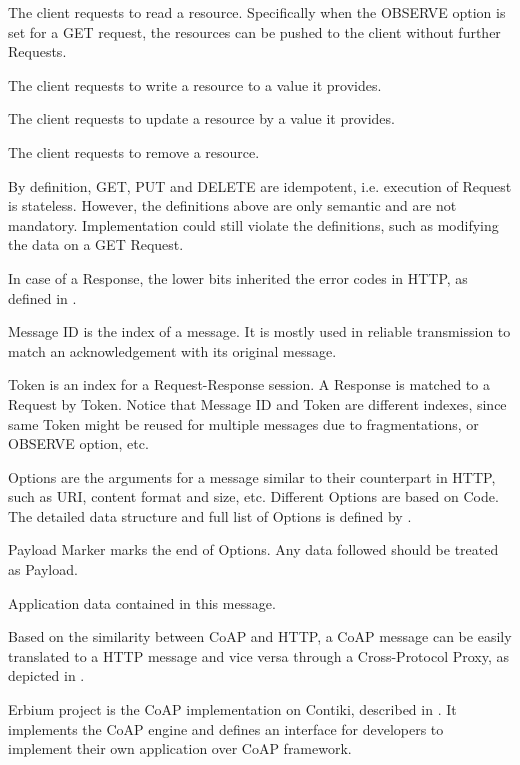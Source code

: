 \begin{description}[style=nextline]
\begin{description}[style=nextline]
		\item[\textbf{GET}] 
		The client requests to read a resource. Specifically when the OBSERVE option is set for a GET request, the resources can be pushed to the client  without further Requests\cite{rfc7641}.
		\item[\textbf{PUT}] 
		The client requests to write a resource to a value it provides.
		\item[\textbf{POST}] 
		The client requests to update a resource by a value it provides.
		\item[\textbf{DELETE}]
		 The client requests to remove a resource.
	\end{description}
	By definition, GET, PUT and DELETE are idempotent, i.e. execution of Request is stateless. However, the definitions above are only semantic and are not mandatory. Implementation could still violate the definitions, such as modifying the data on a GET Request.
	
	In case of a Response, the lower bits inherited the error codes in HTTP, as defined in \cite{rfc2616}.
	\item[\textbf{Message ID}]
	Message ID is the index of a message. It is mostly used in reliable transmission to match an acknowledgement with its original message.
	\item[\textbf{Token}]
	Token is an index for a Request-Response session. A Response is matched to a Request by Token. Notice that Message ID and Token are different indexes, since same Token might be reused for multiple messages due to fragmentations, or OBSERVE option, etc.
	\item[\textbf{Options}]
	Options are the arguments for a message similar to their counterpart in HTTP, such as URI, content format and size, etc. Different Options are based on Code. The detailed data structure and full list of Options is defined by \cite{rfc7252}.
	\item[\textbf{Payload Marker}]
	Payload Marker marks the end of Options. Any data followed should be treated as Payload.
	\item[\textbf{Payload}]
	Application data contained in this message. 
\end{description}

Based on the similarity between CoAP and HTTP, a CoAP message can be easily translated to a HTTP message and vice versa through a Cross-Protocol Proxy, as depicted in \cite{rfc7252}.

Erbium\cite{Erbium} project is the CoAP implementation on Contiki, described in \cite{ContikiCoap}. It implements the CoAP engine and defines an interface for developers to implement their own application over CoAP framework. 

